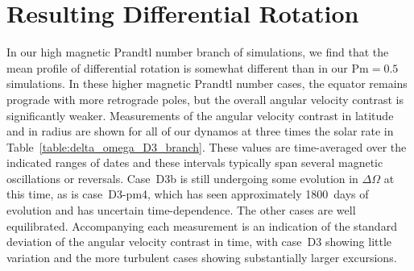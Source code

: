 \section{Resulting Differential Rotation}
In our high magnetic Prandtl number branch of simulations, we find that the
mean profile of differential rotation is somewhat different than in
our $\mathrm{Pm}=0.5$ simulations. In these higher magnetic Prandtl
number cases, the equator remains prograde with more retrograde poles,
but the overall angular velocity contrast is significantly weaker.
Measurements of the angular velocity contrast in latitude and in
radius are shown for all of our dynamos at three times the solar rate
in Table~\ref{table:delta_omega_D3_branch}.  These values are
time-averaged over the indicated ranges of dates and these intervals
typically span several magnetic oscillations or reversals.
Case~D3b is still undergoing some
evolution in $\Delta \Omega$ at this time, as is case~D3-pm4, which
has seen approximately 1800~days of evolution and has uncertain
time-dependence. The other cases are well equilibrated.
Accompanying each measurement is an indication of the standard
deviation of the angular velocity contrast in time, with case~D3
showing little variation and the more turbulent cases showing
substantially larger excursions.  

\clearpage 


